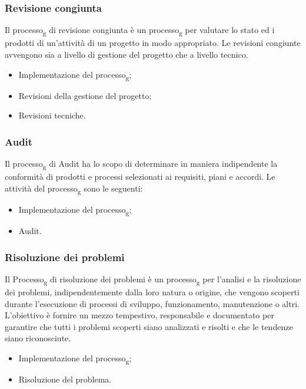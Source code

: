 \subsubsection{Revisione congiunta}
Il processo\textsubscript{g} di revisione congiunta è un processo\textsubscript{g} per valutare lo stato ed i prodotti di un'attività di un progetto in modo appropriato. Le revisioni congiunte avvengono sia a livello di gestione del progetto che a livello tecnico.
\begin{itemize}
\item Implementazione del processo\textsubscript{g};
\item Revisioni della gestione del progetto;
\item Revisioni tecniche.
\end{itemize}

\subsubsection{Audit}
Il processo\textsubscript{g} di Audit ha lo scopo di determinare in maniera indipendente la conformità di prodotti e processi selezionati ai requisiti, piani e accordi.
Le attività del processo\textsubscript{g} sono le seguenti:
\begin{itemize}
\item Implementazione del processo\textsubscript{g};
\item Audit.
\end{itemize}

\subsubsection{Risoluzione dei problemi}
Il Processo\textsubscript{g} di risoluzione dei problemi è un processo\textsubscript{g} per l'analisi e la risoluzione dei problemi, indipendentemente dalla loro natura o origine, che vengono scoperti durante l'esecuzione di processi di sviluppo, funzionamento, manutenzione o altri. L'obiettivo è fornire un mezzo tempestivo, responsabile e documentato per garantire che tutti i problemi scoperti siano analizzati e risolti e che le tendenze siano riconosciute.
\begin{itemize}
\item Implementazione del processo\textsubscript{g};
\item Risoluzione del problema.
\end{itemize}

